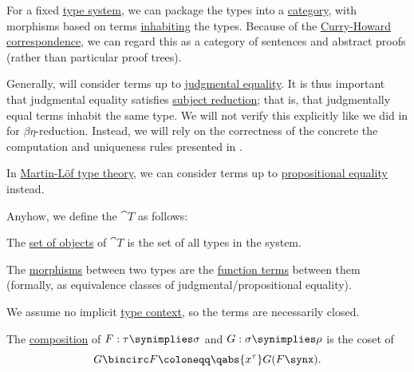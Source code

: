 \begin{definition}\label{def:category_of_types}
  For a fixed \hyperref[def:abstract_type_system]{type system}, we can package the types into a \hyperref[def:category]{category}, with morphisms based on terms  \hyperref[def:type_habitation]{inhabiting} the types. Because of the \hyperref[con:curry_howard_correspondence]{Curry-Howard correspondence}, we can regard this as a category of sentences and abstract proofs (rather than particular proof trees).

  Generally, will consider terms up to \hyperref[con:equality]{judgmental equality}. It is thus important that judgmental equality satisfies \hyperref[con:subject_reduction]{subject reduction}; that is, that judgmentally equal terms inhabit the same type. We will not verify this explicitly like we did in  for \( \beta\eta \)-reduction. Instead, we will rely on the correctness of the concrete the computation and uniqueness rules presented in .

  In \hyperref[def:martin_lof_type_theory]{Martin-L\"of type theory}, we can consider terms up to \hyperref[def:mltt_propositional_equality]{propositional equality} instead.

  Anyhow, we define the  \( \cat{T} \) as follows:
  \begin{thmenum}
     The \hyperref[def:category/objects]{set of objects} of \( \cat{T} \) is the set of all types in the system.

     The \hyperref[def:category/morphisms]{morphisms} between two types are the \hyperref[def:type_theory_function_term]{function terms} between them (formally, as equivalence classes of judgmental/propositional equality).

    We assume no implicit \hyperref[def:type_context]{type context}, so the terms are necessarily closed.

     The \hyperref[def:category/composition]{composition} of \( F: \tau \synimplies \sigma \) and \( G: \sigma \synimplies \rho \) is the coset of
    \begin{equation*}
      G \bincirc F \coloneqq \qabs {x^\tau} G(F \synx).
    \end{equation*}


\end{thmenum}
\end{definition}
